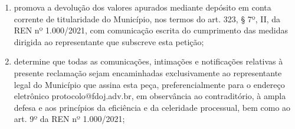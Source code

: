 \begin{enumerate}[resume]
\begin{enumerate}
        \item promova a devolução dos valores apurados mediante depósito em conta corrente de titularidade do Município, nos termos do art. 323, § 7º, II, da REN nº 1.000/2021, com comunicação escrita do cumprimento das medidas dirigida ao representante que subscreve esta petição;
        \item determine que todas as comunicações, intimações e notificações relativas à presente reclamação sejam encaminhadas exclusivamente ao representante legal do Município que assina esta peça, preferencialmente para o endereço eletrônico protocolo@fdoj.adv.br, em observância ao contraditório, à ampla defesa e aos princípios da eficiência e da celeridade processual, bem como ao art. 9º da REN nº 1.000/2021;

    \end{enumerate}

\end{enumerate}